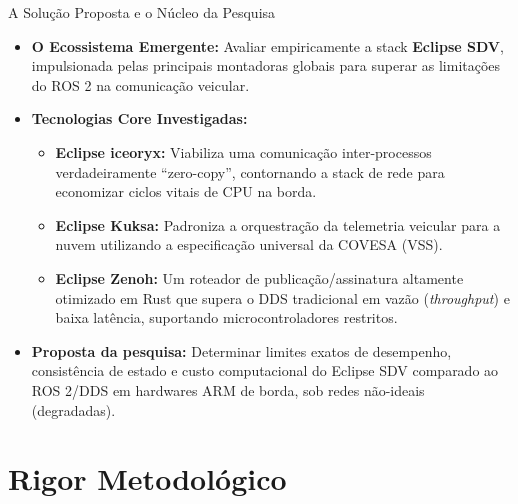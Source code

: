 \documentclass[aspectratio=169,xcolor=dvipsnames]{beamer}
\begin{document}
\begin{frame}{A Solução Proposta e o Núcleo da Pesquisa}
    \begin{itemize}
        \item \textbf{O Ecossistema Emergente:} Avaliar empiricamente a stack \textbf{Eclipse SDV}, impulsionada pelas principais montadoras globais para superar as limitações do ROS 2 na comunicação veicular.
        \item \textbf{Tecnologias Core Investigadas:}
              \begin{itemize}
                  \item \textbf{Eclipse iceoryx:} Viabiliza uma comunicação inter-processos verdadeiramente ``zero-copy'', contornando a stack de rede para economizar ciclos vitais de CPU na borda.
                  \item \textbf{Eclipse Kuksa:} Padroniza a orquestração da telemetria veicular para a nuvem utilizando a especificação universal da COVESA (VSS).
                  \item \textbf{Eclipse Zenoh:} Um roteador de publicação/assinatura altamente otimizado em Rust que supera o DDS tradicional em vazão (\textit{throughput}) e baixa latência, suportando microcontroladores restritos.
              \end{itemize}
        \item \textbf{Proposta da pesquisa:} Determinar limites exatos de desempenho, consistência de estado e custo computacional do Eclipse SDV comparado ao ROS 2/DDS em hardwares ARM de borda, sob redes não-ideais (degradadas).
    \end{itemize}
\end{frame}

\section{Rigor Metodológico}
\end{document}

